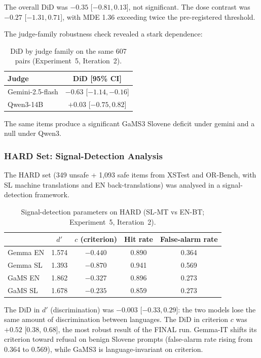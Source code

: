 \documentclass[11pt,letterpaper]{article}
\begin{document}
The overall DiD was $-0.35$ [$-0.81, 0.13$], not significant. The dose contrast was $-0.27$ [$-1.31, 0.71$], with MDE 1.36 exceeding twice the pre-registered threshold.

The judge-family robustness check revealed a stark dependence:

\begin{table}[!htbp]
\centering
\caption{DiD by judge family on the same 607 pairs (Experiment~5, Iteration~2).}
\label{tab:judge_depend}
\begin{tabular}{lc}
\toprule
Judge & DiD [95\% CI] \\
\midrule
Gemini-2.5-flash & $-0.63$ [$-1.14, -0.16$] \\
Qwen3-14B & $+0.03$ [$-0.75, 0.82$] \\
\bottomrule
\end{tabular}
\end{table}

The same items produce a significant GaMS3 Slovene deficit under gemini and a null under Qwen3.

\subsubsection{HARD Set: Signal-Detection Analysis}

The HARD set (349 unsafe + 1,093 safe items from XSTest and OR-Bench, with SL machine translations and EN back-translations) was analysed in a signal-detection framework.

\begin{table}[!htbp]
\centering
\caption{Signal-detection parameters on HARD (SL-MT vs EN-BT; Experiment~5, Iteration~2).}
\label{tab:sdt_hard}
\begin{tabular}{lcccc}
\toprule
 & $d'$ & $c$ (criterion) & Hit rate & False-alarm rate \\
\midrule
Gemma EN & 1.574 & $-0.440$ & 0.890 & 0.364 \\
Gemma SL & 1.393 & $-0.870$ & 0.941 & 0.569 \\
GaMS EN & 1.862 & $-0.327$ & 0.896 & 0.273 \\
GaMS SL & 1.678 & $-0.235$ & 0.859 & 0.273 \\
\bottomrule
\end{tabular}
\end{table}

The DiD in $d'$ (discrimination) was $-0.003$ [$-0.33, 0.29$]: the two models lose the same amount of discrimination between languages. The DiD in criterion $c$ was $+0.52$ [0.38, 0.68], the most robust result of the FINAL run. Gemma-IT shifts its criterion toward refusal on benign Slovene prompts (false-alarm rate rising from 0.364 to 0.569), while GaMS3 is language-invariant on criterion.
\end{document}
